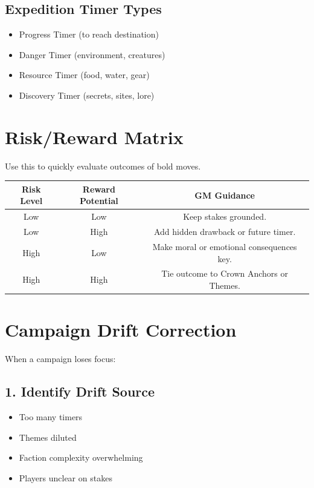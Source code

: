 \documentclass[11pt]{article}
\begin{document}
\subsection{Expedition Timer Types}

\begin{itemize}
    \item Progress Timer (to reach destination)
    \item Danger Timer (environment, creatures)
    \item Resource Timer (food, water, gear)
    \item Discovery Timer (secrets, sites, lore)
\end{itemize}


\section{Risk/Reward Matrix}
\label{appendix:risk-reward}

Use this to quickly evaluate outcomes of bold moves.

\begin{center}
\begin{longtable}{|c|c|c|}
\hline
\textbf{Risk Level} & \textbf{Reward Potential} & \textbf{GM Guidance} \\
\hline
Low & Low & Keep stakes grounded. \\
Low & High & Add hidden drawback or future timer. \\
High & Low & Make moral or emotional consequences key. \\
High & High & Tie outcome to Crown Anchors or Themes. \\
\hline
\end{longtable}
\end{center}


\section{Campaign Drift Correction}
\label{appendix:drift}

When a campaign loses focus:

\subsection{1. Identify Drift Source}
\begin{itemize}
    \item Too many timers
    \item Themes diluted
    \item Faction complexity overwhelming
    \item Players unclear on stakes
\end{itemize}
\end{document}
